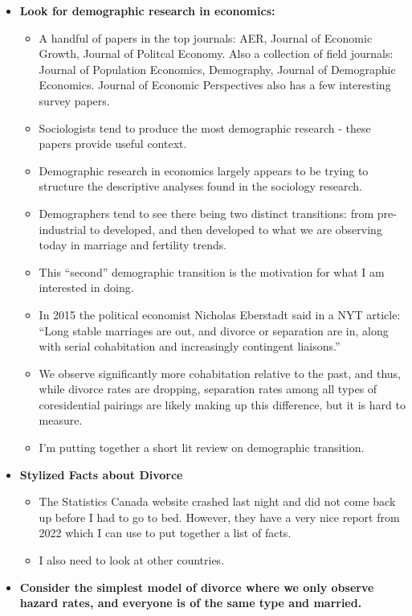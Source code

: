 \documentclass{article}
\begin{document}
\begin{itemize}
\item \textbf{Look for demographic research in economics:}
\begin{itemize}
\item A handful of papers in the top journals: AER, Journal of Economic Growth, Journal of Politcal Economy. Also a collection of field journals: Journal of Population Economics, Demography, Journal of Demographic Economics. Journal of Economic Perspectives also has a few interesting survey papers.
\item Sociologists tend to produce the most demographic research - these papers provide useful context. 
\item Demographic research in economics largely appears to be trying to structure the descriptive analyses found in the sociology research.
\item Demographers tend to see there being two distinct transitions: from pre-industrial to developed, and then developed to what we are observing today in marriage and fertility trends.
\item This ``second'' demographic transition is the motivation for what I am interested in doing.
\item In 2015 the political economist Nicholas Eberstadt said in a NYT article: ``Long stable marriages are out, and divorce or separation are in, along with serial cohabitation and increasingly contingent liaisons.''
\item We observe significantly more cohabitation relative to the past, and thus, while divorce rates are dropping, separation rates among all types of coresidential pairings are likely making up this difference, but it is hard to measure. 
\item I'm putting together a short lit review on demographic transition.
\end{itemize}


\item \textbf{Stylized Facts about Divorce}
\begin{itemize}
\item The Statistics Canada website crashed last night and did not come back up before I had to go to bed. However, they have a very nice report from 2022 which I can use to put together a list of facts.
\item I also need to look at other countries.
\end{itemize}

\item \textbf{Consider the simplest model of divorce where we only observe hazard rates, and everyone is of the same type and married.}


\end{itemize}
\end{document}
